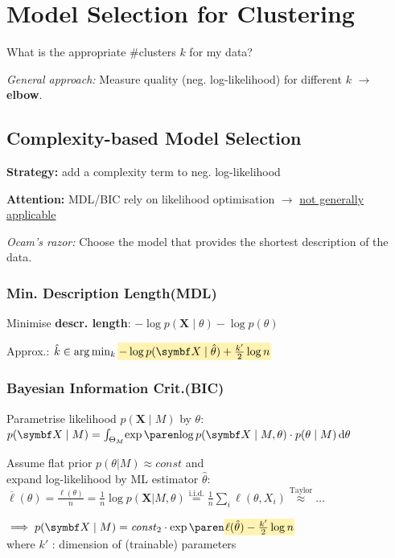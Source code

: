 \section{Model Selection for Clustering}

What is the appropriate \#clusters $k$ for my data?

\emph{General approach:} Measure quality (neg. log-likelihood) for different $k$ \enspace $\to$ \textbf{elbow}.

\subsection{Complexity-based Model Selection}

\textbf{Strategy:} add a complexity term to neg. log-likelihood

\textbf{Attention:} MDL/BIC rely on likelihood optimisation $\to$ \underline{not generally applicable}


\emph{Ocam's razor:}\enspace
Choose the model that provides the shortest description of the data.

\subsubsection{Min. Description Length\quad (MDL)}

Minimise \textbf{descr. length}:\enspace
$-\log p(\symbf X\mid \theta) - \log p(\theta)$

Approx.:\enspace
$\hat k \in \arg\min_k \highlight*{-\log p(\symbf X\mid \hat\theta) + \frac{k'}{2} \log n}$

\subsubsection{Bayesian Information Crit.\quad (BIC)}

Parametrise likelihood $p(\symbf X\mid M)$ by $\theta$:\\
\enspace $p(\symbf X\mid M) = \int_{\Theta_M} \! \exp(\log p(\symbf X\mid M, \theta)) \cdot p(\theta\mid M) \diff\theta$

Assume flat prior $p(\theta\vert M) \approx \mathit{const}$ and\\
expand log-likelihood by ML estimator $\hat\theta$:\\
$\overline\ell (\theta) = \frac{\ell(\theta)}{n} = \frac1n \log p(\symbf X\vert M,\theta) \overset{\text{i.i.d.}}{=} \frac1n \sum_i \ell(\theta, X_i) \overset{\textrm{Taylor}}{\approx} \ldots$

$\implies p(\symbf X\mid M) = \mathit{const}_2 \cdot \exp( \highlight*{\ell (\hat\theta) - \frac{k'}{2} \log n} )$\\
\quad where $k'$ : dimension of (trainable) parameters

